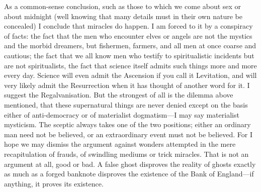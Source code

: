 As a common-sense conclusion, such as those to which we come about sex or about midnight (well knowing that many details must in their own nature be concealed) I conclude that miracles do happen. I am forced to it by a conspiracy of facts: the fact that the men who encounter elves or angels are not the mystics and the morbid dreamers, but fishermen, farmers, and all men at once coarse and cautious; the fact that we all know men who testify to spiritualistic incidents but are not spiritualists, the fact that science itself admits such things more and more every day. Science will even admit the Ascension if you call it Levitation, and will very likely admit the Resurrection when it has thought of another word for it. I suggest the Regalvanisation. But the strongest of all is the dilemma above mentioned, that these supernatural things are never denied except on the basis either of anti-democracy or of materialist dogmatism—I may say materialist mysticism. The sceptic always takes one of the two positions; either an ordinary man need not be believed, or an extraordinary event must not be believed. For I hope we may dismiss the argument against wonders attempted in the mere recapitulation of frauds, of swindling mediums or trick miracles. That is not an argument at all, good or bad. A false ghost disproves the reality of ghosts exactly as much as a forged banknote disproves the existence of the Bank of England—if anything, it proves its existence.

